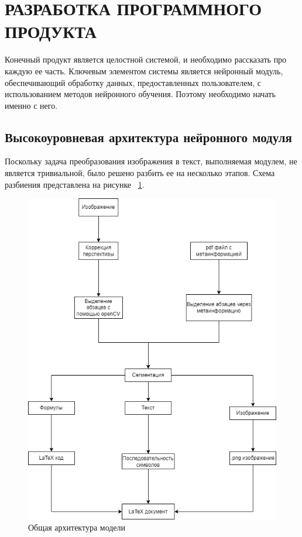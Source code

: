 \section{РАЗРАБОТКА ПРОГРАММНОГО ПРОДУКТА}

Конечный продукт является целостной системой, и необходимо рассказать про каждую ее часть. Ключевым элементом системы является нейронный модуль,
обеспечивающий обработку данных, предоставленных пользователем, с использованием методов нейронного обучения. Поэтому необходимо начать именно с него.
\subsection{Высокоуровневая архитектура нейронного модуля}

Поскольку задача преобразования изображения в текст, выполняемая модулем, не является тривиальной, было решено разбить ее на несколько этапов. 
Схема разбиения представлена на рисунке ~\ref{neuro_model}.

\begin{figure}
\includegraphics[scale=0.55]{img/Blank_diagram.png}
\caption{Общая архитектура модели}
\label{neuro_model}
\end{figure}

